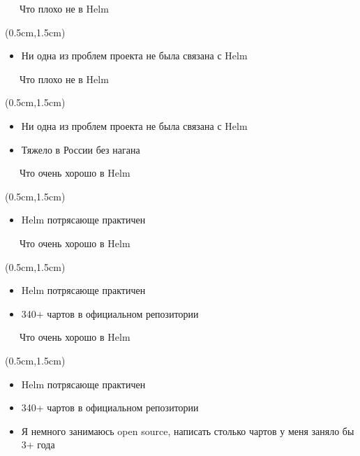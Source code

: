 \documentclass[xetex,18pt,aspectratio=43]{beamer}
\begin{document}
\begin{Large}
\begin{frame}{\ \ \ Что плохо не в Helm}
\begin{textblock*}{\framewidth-0.8cm}(0.5cm,1.5cm)
\begin{itemize}
  \item Ни одна из проблем проекта не была связана с Helm
\end{itemize}
\end{textblock*}
\end{frame}

\begin{frame}{\ \ \ Что плохо не в Helm}
\begin{textblock*}{\framewidth-0.8cm}(0.5cm,1.5cm)
\begin{itemize}
  \item Ни одна из проблем проекта не была связана с Helm
  \item Тяжело в России без нагана
\end{itemize}
\end{textblock*}
\end{frame}

\begin{frame}{\ \ \ Что очень хорошо в Helm}
\begin{textblock*}{\framewidth-0.8cm}(0.5cm,1.5cm)
\begin{itemize}
  \item Helm потрясающе практичен
\end{itemize}
\end{textblock*}
\end{frame}

\begin{frame}{\ \ \ Что очень хорошо в Helm}
\begin{textblock*}{\framewidth-0.8cm}(0.5cm,1.5cm)
\begin{itemize}
  \item Helm потрясающе практичен
  \item 340+ чартов в официальном репозитории
\end{itemize}
\end{textblock*}
\end{frame}

\begin{frame}{\ \ \ Что очень хорошо в Helm}
\begin{textblock*}{\framewidth-0.8cm}(0.5cm,1.5cm)
\begin{itemize}
  \item Helm потрясающе практичен
  \item 340+ чартов в официальном репозитории
  \item Я немного занимаюсь open source, написать столько чартов у меня заняло
    бы 3+ года
\end{itemize}
\end{textblock*}
\end{frame}


\end{Large}
\end{document}
